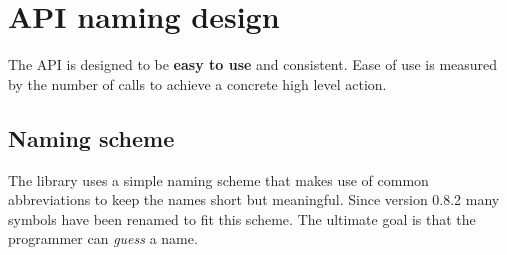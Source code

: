 \hypertarget{api-naming-design}{%
\section{API naming design}\label{api-naming-design}}

The API is designed to be \textbf{easy to use} and consistent. Ease of
use is measured by the number of calls to achieve a concrete high level
action.

\hypertarget{naming-scheme}{%
\subsection{Naming scheme}\label{naming-scheme}}

The library uses a simple naming scheme that makes use of common
abbreviations to keep the names short but meaningful. Since version
0.8.2 many symbols have been renamed to fit this scheme. The ultimate
goal is that the programmer can \emph{guess} a name.

